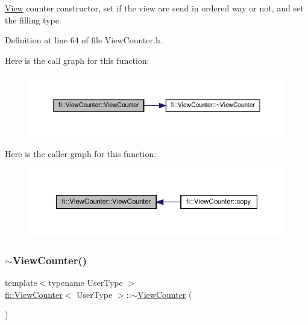 \hyperlink{classfi_1_1View}{View} counter constructor, set if the view are send in ordered way or not, and set the filling type. 



Definition at line 64 of file View\+Counter.\+h.

Here is the call graph for this function\+:
\nopagebreak
\begin{figure}[H]
\begin{center}
\leavevmode
\includegraphics[width=350pt]{df/dae/classfi_1_1ViewCounter_a91de9bc19ea0f0629ebb689ecae07f68_cgraph}
\end{center}
\end{figure}
Here is the caller graph for this function\+:
\nopagebreak
\begin{figure}[H]
\begin{center}
\leavevmode
\includegraphics[width=350pt]{df/dae/classfi_1_1ViewCounter_a91de9bc19ea0f0629ebb689ecae07f68_icgraph}
\end{center}
\end{figure}
\mbox{\label{classfi_1_1ViewCounter_abc86ae6ba64c6be66d512ab6412ce108}} 
\subsubsection{\texorpdfstring{$\sim$\+View\+Counter()}{~ViewCounter()}}
{\footnotesize\ttfamily template$<$typename User\+Type $>$ \\
\hyperlink{classfi_1_1ViewCounter}{fi\+::\+View\+Counter}$<$ User\+Type $>$\+::$\sim$\hyperlink{classfi_1_1ViewCounter}{View\+Counter} (\begin{DoxyParamCaption}{ }\end{DoxyParamCaption})\hspace{0.3cm}{\ttfamily [default]}}



